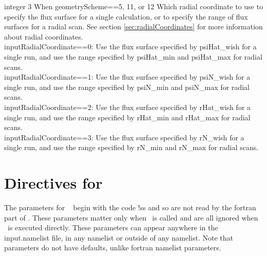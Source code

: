 {integer}
{3}
{When {\ttfamily geometryScheme}==5, 11, or 12}
{Which radial coordinate to use to specify the flux surface for a single calculation,
or to specify the range of flux surfaces for a radial scan. See section \ref{sec:radialCoordinates}
for more information about radial coordinates.\\

{\ttfamily inputRadialCoordinate}==0: Use the flux surface specified by {\ttfamily psiHat\_wish}
for a single run, and use the range specified by {\ttfamily psiHat\_min} and {\ttfamily psiHat\_max} for radial scans.\\

{\ttfamily inputRadialCoordinate}==1: Use the flux surface specified by {\ttfamily psiN\_wish}
for a single run, and use the range specified by {\ttfamily psiN\_min} and {\ttfamily psiN\_max} for radial scans.\\

{\ttfamily inputRadialCoordinate}==2: Use the flux surface specified by {\ttfamily rHat\_wish}
for a single run, and use the range specified by {\ttfamily rHat\_min} and {\ttfamily rHat\_max} for radial scans.\\

{\ttfamily inputRadialCoordinate}==3: Use the flux surface specified by {\ttfamily rN\_wish}
for a single run, and use the range specified by {\ttfamily rN\_min} and {\ttfamily rN\_max} for radial scans.
}


\section{Directives for \sfincsScan}
\label{sec:sfincsScanParams}

The parameters for \sfincsScan~ begin with the code {\ttfamily !ss} and so are not read by the fortran part of \sfincs.
These parameters matter only when \sfincsScan~is called and are all ignored when \sfincs~is executed directly.
These parameters can appear anywhere in the {\ttfamily input.namelist} file, in any namelist or outside of any namelist.
Note that \sfincsScan~ parameters do not have defaults, unlike fortran namelist parameters.\\

